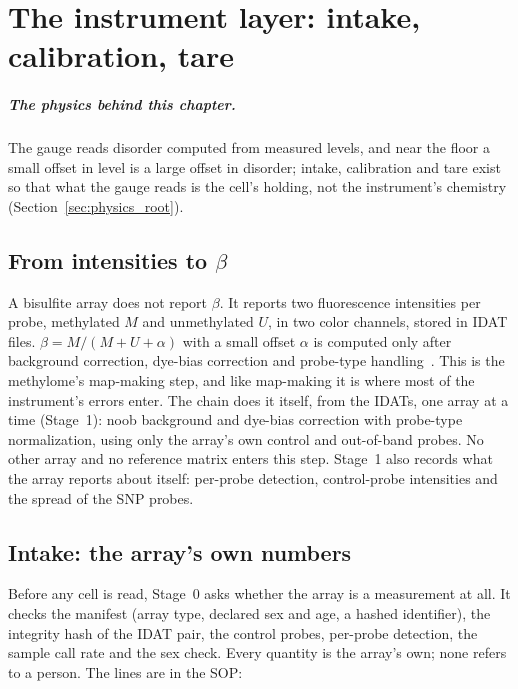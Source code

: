 \chapter{The instrument layer: intake, calibration, tare}\label{ch:instrument}

\paragraph{The physics behind this chapter.} The gauge reads disorder computed from measured levels, and near the floor a small offset in level is a large offset in disorder; intake, calibration and tare exist so that what the gauge reads is the cell's holding, not the instrument's chemistry (Section~\ref{sec:physics_root}).

\section{From intensities to $\beta$}

A bisulfite array does not report $\beta$. It reports two fluorescence intensities per probe, methylated $M$ and unmethylated
$U$, in two color channels, stored in IDAT files. $\beta=M/(M+U+\alpha)$ with a small offset $\alpha$ is computed only after
background correction, dye-bias correction and probe-type handling~\cite{Triche2013,Fortin2017}. This is the methylome's
map-making step, and like map-making it is where most of the instrument's errors enter. The chain does it itself, from the IDATs,
one array at a time (Stage~1): noob background and dye-bias correction with
probe-type normalization, using only the array's own control and out-of-band probes. No other array and no reference matrix enters
this step. Stage~1 also records what the array reports about itself: per-probe detection, control-probe intensities and the spread of the
SNP probes.

\section{Intake: the array's own numbers}

Before any cell is read, Stage~0 asks whether the array is a measurement at all. It checks
the manifest (array type, declared sex and age, a hashed identifier), the integrity hash of the IDAT pair, the control probes, per-probe
detection, the sample call rate and the sex check. Every quantity is the array's own; none refers to a person. The lines are in the SOP:


